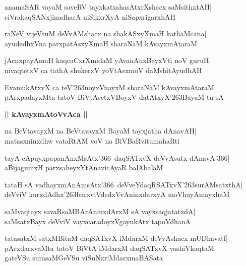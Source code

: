 \documentclass[twoside,12pt,openright]{book}
\def\S{\char'263}
\newcounter{shloka}[chapter]
\def\uvaca#1{\centerline{{\large\textbf{#1}}}}
\begin{document}
\begin{shloka}%
anamaSAR vayaM saveRV tayxkatxshasAtxrXshacx saMsithxtAH|\\
ciVrakaqSANxjinadharA niSikxrXyA niSapxrigarxhAH
\end{shloka}

\begin{shloka}%
raNeV vijeVtuM deVvAMshacx na shakASxyXmaH kathaMcana|\\
ayudedhxVna parxpatAsxyXmaH sharaNaM kAvayxmAtaraM
\end{shloka}

\begin{shloka}%
jAcnxpayAmaH kaqcaCxrXmidaM yAvanAnxBeyxVti noV guruH|\\
nivaqtetxV ca tathA shukerxV yoVtAsxmoV daMshitAyudhAH
\end{shloka}

\begin{shloka}%
EvamukAtxvX ca teV\S noyxVnayxM sharaNaM kAvayxmAtaraM|\\
pArxpadayxMta tatoV BiVtAsetxVBoyxV datAtxvX\S BayaM tu sA
\end{shloka}

\uvaca{|| kAvayxmAtoVvAca ||}
\begin{shloka}%
na BeVtavayxM na BeVtavayxM BayaM tayxjatha dAnavAH|\\
matasxninxdhw vataRtAM voV na BiVBaRvitumahaRti
\end{shloka}

\begin{shloka}%
tayA cApuyxpapanAnxMsAtx\char'366\ daqSATxvX deVvAsutx
dAnavA\char'366|\\
aBijagumxH parxsaheyxYtAnavicAyaR balAbalaM
\end{shloka}

\begin{shloka}%
tataH sA vadhayxmAnAmsAtx\char'366\ deVveYdaqRSATxvX\S surAMsatxthA|\\
deVviV kurxdAdhx\S barxviVdedxVvAninxdarxyA moVhayAmayxhaM
\end{shloka}

\begin{shloka}%
saMvaqtayx savaRsaMBArAninxdArxM sA vayxsaqjatatxdA|\\
saMsatxBayx deVviV vayxcaradoyxVgayukAtx tapoVdhanA
\end{shloka}

\begin{shloka}%
tatasatxM satxMBitaM daqSATxvX iMdarxM deVvAshacx mUDhavatf|\\
pArxdarxvaMta tatoV BiVtA iMdarxM daqSATxvX vashiVkaqtaM\\
gateVSu surasaMGeVSu viSuNxriMdarxmaBASata
\end{shloka}
\end{document}
